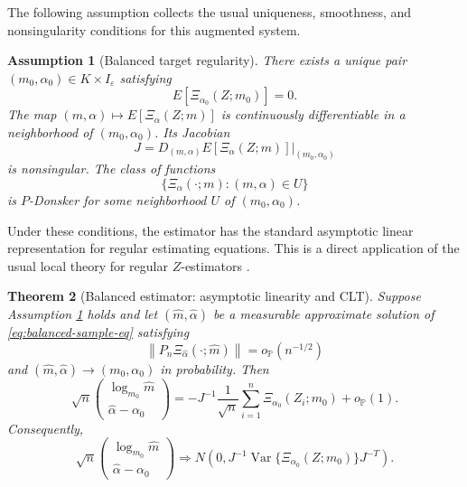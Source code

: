 \documentclass[11pt]{article}
\newtheorem{theorem}{Theorem}
\newtheorem{assumption}[theorem]{Assumption}
\DeclareMathOperator{\Var}{Var}
\newcommand{\Pbb}{\mathbb P}
\newcommand{\eps}{\varepsilon}
\newcommand{\1}{\mathbf{1}}
\begin{document}
The following assumption collects the usual uniqueness, smoothness, and
nonsingularity conditions for this augmented system.
\begin{assumption}[Balanced target regularity]\label{ass:balanced}
There exists a unique pair $(m_0,\alpha_0)\in K\times I_\eps$ satisfying
\[
 E[\Xi_{\alpha_0}(Z;m_0)]=0.
\]
The map $(m,\alpha)\mapsto E[\Xi_\alpha(Z;m)]$ is continuously differentiable in a neighborhood of $(m_0,\alpha_0)$.  Its Jacobian
\begin{equation}\label{eq:J-balanced}
 J=
 D_{(m,\alpha)}E[\Xi_\alpha(Z;m)]\big|_{(m_0,\alpha_0)}
\end{equation}
is nonsingular.  The class of functions
\[
 \{\Xi_\alpha(\cdot;m):(m,\alpha)\in U\}
\]
is $P$-Donsker for some neighborhood $U$ of $(m_0,\alpha_0)$.
\end{assumption}

Under these conditions, the estimator has the standard asymptotic linear
representation for regular estimating equations. This is a direct application of the usual local theory for regular
$Z$-estimators \citep{vandervaart_1996_WeakConvergenceEmpirical, vandervaart_1998_AsymptoticStatistics}.


\begin{theorem}[Balanced estimator: asymptotic linearity and CLT]\label{thm:balanced-clt}
Suppose Assumption \ref{ass:balanced} holds and let $(\widehat m,\widehat\alpha)$ be a measurable approximate solution of \eqref{eq:balanced-sample-eq} satisfying
\[
 \left\|P_n\Xi_{\widehat\alpha}(\cdot;\widehat m)\right\|=o_{\Pbb}(n^{-1/2})
\]
and $(\widehat m,\widehat\alpha)\to(m_0,\alpha_0)$ in probability.  Then
\begin{equation}\label{eq:balanced-linearization}
 \sqrt n
 \begin{pmatrix}
 \log_{m_0}\widehat m\\
 \widehat\alpha-\alpha_0
 \end{pmatrix}
 =
 -J^{-1}\frac1{\sqrt n}\sum_{i=1}^n\Xi_{\alpha_0}(Z_i;m_0)+o_{\Pbb}(1).
\end{equation}
Consequently,
\begin{equation}\label{eq:balanced-normal}
 \sqrt n
 \begin{pmatrix}
 \log_{m_0}\widehat m\\
 \widehat\alpha-\alpha_0
 \end{pmatrix}
 \Rightarrow
 N\left(0,
 J^{-1}\Var\{\Xi_{\alpha_0}(Z;m_0)\}J^{-T}
 \right).
\end{equation}
\end{theorem}
\end{document}

